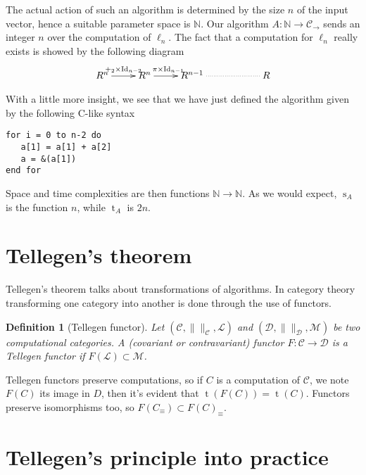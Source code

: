 \documentclass{article}
\newcommand{\cat}[1]{\mathscr{#1}}
\newcommand{\C}{\cat{C}}
\newcommand{\D}{\cat{D}}
\renewcommand{\L}{\cat{L}}
\newcommand{\size}[1]{\lVert#1\rVert}
\DeclareMathOperator{\Id}{Id}
\newcommand{\N}{\mathbb{N}}
\newcommand{\ra}{\rightarrow}
\DeclareMathOperator{\Time}{t}
\DeclareMathOperator{\Space}{s}
\newtheorem{definition}{Definition}
\begin{document}
  The actual action of such an algorithm is determined by the size $n$
  of the input vector, hence a suitable parameter space is $\N$. Our
  algorithm $A:\N\ra\C_\ra$ sends an integer $n$ over the computation
  of $\ell_n$. The fact that a computation for $\ell_n$ really exists
  is showed by the following diagram
  \[\xymatrix{
    R^n\ar[r]^{+_2\times{\Id_{n-2}}} & R^n\ar[r]^{\pi\times{\Id_{n-1}}} &
    R^{n-1} \ar@{.}[rr] && R
  }\]
  
  With a little more insight, we see that we have just defined the
  algorithm given by the following C-like syntax
  \begin{center}
    \begin{minipage}{0.7\textwidth}
\begin{verbatim}
for i = 0 to n-2 do
   a[1] = a[1] + a[2]
   a = &(a[1])
end for
\end{verbatim}
    \end{minipage}
  \end{center}

  Space and time complexities are then functions $\N\ra\N$. As we
  would expect, $\Space_A$ is the function $n$, while $\Time_A$ is
  $2n$.


  \section{Tellegen's theorem}

  Tellegen's theorem talks about transformations of algorithms. In
  category theory transforming one category into another is done
  through the use of functors.

  \begin{definition}[Tellegen functor]
    Let $(\C,\size{}_{\C},\L)$ and $(\D,\size{}_{\D},\cat{M})$ be two
    computational categories. A (covariant or contravariant) functor
    $F:\C\ra\D$ is a \emph{Tellegen functor} if $F(\L)\subset\cat{M}$.
  \end{definition}

  Tellegen functors preserve computations, so if $C$ is a computation
  of $\C$, we note $F(C)$ its image in $D$, then it's evident that
  $\Time(F(C)) = \Time(C)$. Functors preserve isomorphisms too, so
  $F(C_\equiv) \subset F(C)_\equiv$.


  
  \section{Tellegen's principle into practice}
  \label{sec:practice}
  
\end{document}
